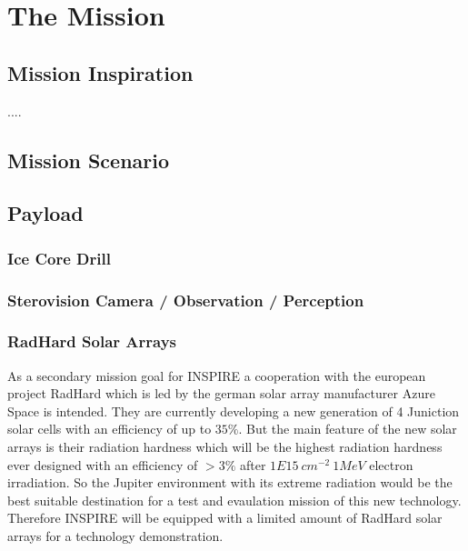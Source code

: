 %
%
%
\chapter{The Mission}
\label{chap:mission}

\section{Mission Inspiration}
\label{sec:inspiration}
....



\section{Mission Scenario}
\label{sec:scenario}


\section{Payload}


\subsection{Ice Core Drill}

\subsection{Sterovision Camera / Observation / Perception}

\subsection{RadHard Solar Arrays}
\label{subsec:radhard}
As a secondary mission goal for INSPIRE a cooperation with the european project RadHard which is led by the german solar array manufacturer Azure Space is intended. They are currently developing a new generation of 4 Juniction solar cells with an efficiency of up to $35 \% $. But the main feature of the new solar arrays is their radiation hardness which will be the highest radiation hardness ever designed with an efficiency of $>3 \% $ after $1E15 \ cm^{-2} \ 1MeV$ electron irradiation. So the Jupiter environment with its extreme radiation would be the best suitable destination for a test and evaulation mission of this new technology. Therefore INSPIRE will be equipped with a limited amount of RadHard solar arrays for a technology demonstration.



